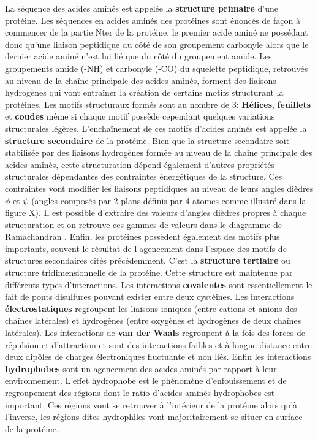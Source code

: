 La séquence des acides aminés est appelée la \textbf{structure primaire} d'une protéine. Les séquences en acides aminés des protéines sont énoncés de façon à commencer de la partie Nter de la protéine, le premier acide aminé ne possédant donc qu'une liaison peptidique du côté de son groupement carbonyle alors que le dernier acide aminé n'est lui lié que du côté du groupement amide.
Les groupements amide (-NH) et carbonyle (-CO) du squelette peptidique, retrouvés au niveau de la chaîne principale des acides aminés, forment des liaisons hydrogènes qui vont entraîner la création de certains motifs structurant la protéines. Les motifs structuraux formés sont au nombre de 3: \textbf{Hélices}, \textbf{feuillets} et \textbf{coudes} même si chaque motif possède cependant quelques variations structurales légères. L’enchaînement de ces motifs d'acides aminés est appelée la \textbf{structure secondaire} de la protéine. Bien que la structure secondaire soit stabilisée par des liaisons hydrogènes formée au niveau de la chaîne principale des acides aminés, cette structuration dépend également d'autres propriétés structurales dépendantes des contraintes énergétiques de la structure. Ces contraintes vont modifier les liaisons peptidiques au niveau de leurs angles dièdres $\phi$ et $\psi$ (angles composés par 2 plans définis par 4 atomes comme illustré dans la figure X). Il est possible d'extraire des valeurs d'angles dièdres propres à chaque structuration et on retrouve ces gammes de valeurs dans le diagramme de Ramachandran \cite{ramachandran1968conformation}.
Enfin, les protéines possèdent également des motifs plus importants, souvent le résultat de l'agencement dans l'espace des motifs de structures secondaires cités précédemment. C'est la \textbf{structure tertiaire} ou structure tridimensionnelle de la protéine. Cette structure est maintenue par différents types d'interactions. Les interactions \textbf{covalentes} sont essentiellement le fait de ponts disulfures pouvant exister entre deux cystéines. Les interactions \textbf{électrostatiques} regroupent les liaisons ioniques (entre cations et anions des chaînes latérales) et hydrogènes (entre oxygènes et hydrogènes de deux chaînes latérales). Les interactions de \textbf{van der Waals} regroupent à la fois des forces de répulsion et d'attraction et sont des interactions faibles et à longue distance entre deux dipôles de charges électroniques fluctuante et non liés. Enfin les interactions \textbf{hydrophobes} sont un agencement des acides aminés par rapport à leur environnement. L'effet hydrophobe est le phénomène d'enfouissement et de regroupement des régions dont le ratio d'acides aminés hydrophobes est important. Ces régions vont se retrouver à l'intérieur de la protéine alors qu'à l'inverse, les régions dites hydrophiles vont majoritairement se situer en surface de la protéine.
